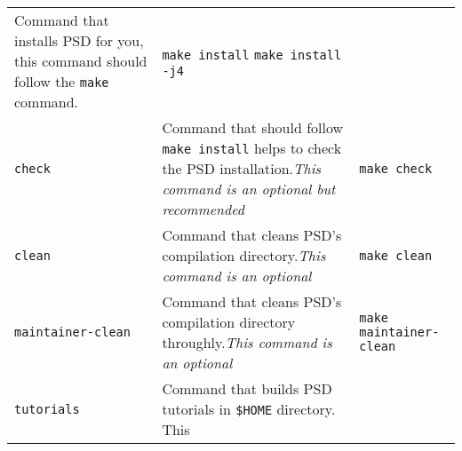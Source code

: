 \begin{longtable}[]{@{}lll@{}}
\begin{minipage}[t]{0.47\columnwidth}
Command that installs PSD for you, this command should follow the
\lstinline!make! command.\strut
\end{minipage} & \begin{minipage}[t]{0.30\columnwidth}\raggedright\strut
\lstinline!make install! \lstinline!make install -j4!\strut
\end{minipage}\tabularnewline
\begin{minipage}[t]{0.15\columnwidth}\raggedright\strut
\lstinline!check!\strut
\end{minipage} & \begin{minipage}[t]{0.47\columnwidth}\raggedright\strut
Command that should follow \lstinline!make install! helps to check the
PSD installation.\emph{This command is an optional but
recommended}\strut
\end{minipage} & \begin{minipage}[t]{0.30\columnwidth}\raggedright\strut
\lstinline!make check!\strut
\end{minipage}\tabularnewline
\begin{minipage}[t]{0.15\columnwidth}\raggedright\strut
\lstinline!clean!\strut
\end{minipage} & \begin{minipage}[t]{0.47\columnwidth}\raggedright\strut
Command that cleans PSD's compilation directory.\emph{This command is an
optional}\strut
\end{minipage} & \begin{minipage}[t]{0.30\columnwidth}\raggedright\strut
\lstinline!make clean!\strut
\end{minipage}\tabularnewline
\begin{minipage}[t]{0.15\columnwidth}\raggedright\strut
\lstinline!maintainer-clean!\strut
\end{minipage} & \begin{minipage}[t]{0.47\columnwidth}\raggedright\strut
Command that cleans PSD's compilation directory throughly.\emph{This
command is an optional}\strut
\end{minipage} & \begin{minipage}[t]{0.30\columnwidth}\raggedright\strut
\lstinline!make maintainer-clean!\strut
\end{minipage}\tabularnewline
\begin{minipage}[t]{0.15\columnwidth}\raggedright\strut
\lstinline!tutorials!\strut
\end{minipage} & \begin{minipage}[t]{0.47\columnwidth}\raggedright\strut
Command that builds PSD tutorials in \lstinline!$HOME! directory. This

\end{minipage}
\end{longtable}
